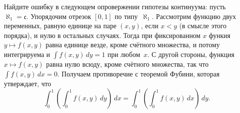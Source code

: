 \begin{problem}
Найдите ошибку в следующем  опровержении гипотезы
континуума: пусть
$\aleph_1=\mathfrak{c}$. Упорядочим отрезок $[0,1]$ по
типу~$\aleph_1$. Рассмотрим функцию двух переменных, равную
единице на паре $(x,y)$, если $x<y$ (в смысле этого порядка), и
нулю в остальных случаях. Тогда при фиксированном $x$ функия
$y\mapsto f(x,y)$ равна единице везде, кроме счётного
множества, и потому интегрируема и $\int f(x,y)\,dy=1$ при
любом~$x$. С другой стороны, функция $x\mapsto f(x,y)$ равна
нулю всюду, кроме счётного множества, так что $\int
f(x,y)\,dx=0$. Получаем противоречие с теоремой
Фубини, которая
утверждает, что
        $$
\int_0^1\left(\int_0^1 f(x,y)\,dy\right)\,dx=
\int_0^1\left(\int_0^1 f(x,y)\,dx\right)\,dy.
        $$
\end{problem}
